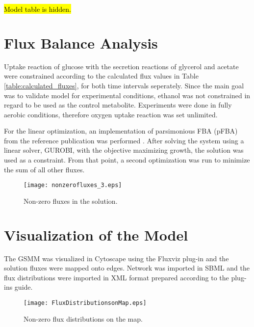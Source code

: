 \hl{Model table is hidden.}
%

\section{Flux Balance Analysis}
Uptake reaction of glucose with the secretion reactions of glycerol and acetate were constrained according to the calculated flux values in Table \ref{table:calculated_fluxes}, for both time intervals seperately. Since the main goal was to validate model for experimental conditions, ethanol was not constrained in regard to be used as the control metabolite. Experiments were done in fully aerobic conditions, therefore oxygen uptake reaction was set unlimited.


For the linear optimization, an implementation of parsimonious FBA (pFBA) from the reference publication was performed \cite{nilsson2016metabolic, AvlantGithub}. After solving the system using a linear solver, GUROBI, with the objective maximizing growth, the solution was used as a constraint. From that point, a second optimization was run to minimize the sum of all other fluxes.

\begin{figure}[H]
  \texttt{[image: nonzerofluxes\_3.eps]}
  \caption[Non-zero fluxes in the solution]{Non-zero fluxes in the solution.}
\label{fig:nonzerofluxes}
\end{figure}

\section{Visualization of the Model}
The GSMM was visualized in Cytoscape \cite{cline2007integration} using the Fluxviz plug-in \cite{konig2010fluxviz} and the solution fluxes were mapped onto edges. Network was imported in SBML \cite{hucka2018systems} and the flux distributions were imported in XML format prepared according to the plug-ins guide.


\begin{figure}[H]
  \texttt{[image: FluxDistributionsonMap.eps]}
  \caption[Map view of the non-zero flux distributions]{Non-zero flux distributions on the map.}
\label{fig:fluxesonmap}
\end{figure}
